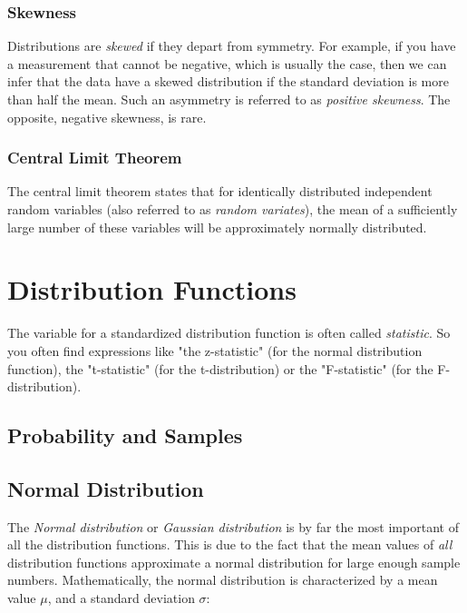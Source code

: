 \subsubsection{ Skewness }
Distributions are \emph{skewed} if they depart from symmetry. For example, if you have a measurement that cannot be negative, which is usually the case, then we can infer that the data have a skewed distribution if the standard deviation is more than half the mean. Such an asymmetry is referred to as \emph{positive skewness}. The opposite, negative skewness, is rare.

\subsubsection{ Central Limit Theorem }
The central limit theorem states that for identically distributed independent random variables (also referred to as \emph{random variates}), the mean of a sufficiently large number of these variables will be approximately normally distributed.


\section{Distribution Functions}

The variable for a standardized distribution function is often called \emph{statistic}. So you often find expressions like "the z-statistic" (for the normal distribution function), the "t-statistic" (for the t-distribution) or the "F-statistic" (for the F-distribution).

  \subsection{Probability and Samples}

  \subsection{Normal Distribution} \label{sec:normalDistribution}

The \emph{Normal distribution} or \emph{Gaussian distribution} is by far the most important of all the distribution functions. This is due to the fact that the mean values of \emph{all} distribution functions approximate a normal distribution for large enough sample numbers.
Mathematically, the normal distribution is characterized by a mean value $\mu$, and a standard deviation $\sigma$:

